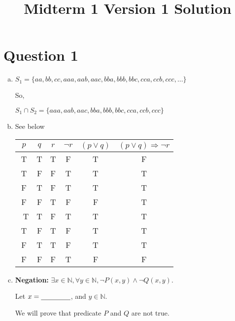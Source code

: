 \documentclass[12pt]{article}
\begin{document}
\title{Midterm 1 Version 1 Solution}
\maketitle

\section*{Question 1}
\begin{enumerate}[a.]
    \item

    $S_1 = \{aa,bb,cc,aaa,aab,aac,bba,bbb,bbc,cca,ccb,ccc,\dots\}$

    So,

    $S_1 \cap S_2 = \{aaa,aab,aac,bba,bbb,bbc,cca,ccb,ccc\}$

    \item

    See below

    \begin{tabular}{c|c|c|c|c|c}
        $p$ & $q$ & $r$ & $\neg r$ & $(p \lor q)$ & $(p \lor q) \Rightarrow \neg r$\\
        \hline
        T & T & T & F & T & F\\
        \hline
        T & F & F & T & T & T\\
        \hline
        F & T & F & T & T & T\\
        \hline
        F & F & T & F & F & T\\
        \
        T & T & F & T & T & T\\
        \hline
        T & F & T & F & T & T\\
        \hline
        F & T & T & F & T & T\\
        \hline
        F & F & F & T & F & F
    \end{tabular}

    \item

    \textbf{Negation:} $\exists x \in \mathbb{N}, \forall y \in \mathbb{N}, \neg
    P(x,y) \land \neg Q(x,y)$.

    \bigskip

    Let $x = \underline{\hspace{1.5cm}}$, and $y \in \mathbb{N}$.

    \bigskip

    We will prove that predicate $P$ and $Q$ are not true.

\end{enumerate}
\end{document}
